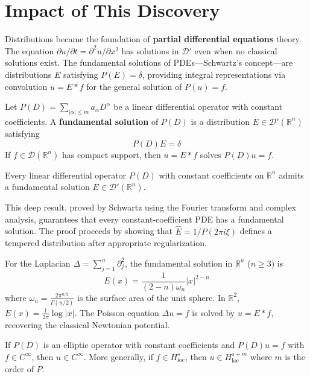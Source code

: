\section{Impact of This Discovery}

Distributions became the foundation of \textbf{partial differential equations} theory. The equation $\partial u / \partial t = \partial^2 u / \partial x^2$ has solutions in $\mathcal{D}'$ even when no classical solutions exist. The fundamental solutions of PDEs---Schwartz's concept---are distributions $E$ satisfying $P(E) = \delta$, providing integral representations via convolution $u = E * f$ for the general solution of $P(u) = f$.

\begin{definition}
Let $P(D) = \sum_{|\alpha| \leq m} a_\alpha D^\alpha$ be a linear differential operator with constant coefficients. A \textbf{fundamental solution} of $P(D)$ is a distribution $E \in \mathcal{D}'(\mathbb{R}^n)$ satisfying
\[P(D)E = \delta\]
If $f \in \mathcal{D}(\mathbb{R}^n)$ has compact support, then $u = E * f$ solves $P(D)u = f$.
\end{definition}

\begin{theorem}
Every linear differential operator $P(D)$ with constant coefficients on $\mathbb{R}^n$ admits a fundamental solution $E \in \mathcal{D}'(\mathbb{R}^n)$.
\end{theorem}

This deep result, proved by Schwartz using the Fourier transform and complex analysis, guarantees that every constant-coefficient PDE has a fundamental solution. The proof proceeds by showing that $\hat{E} = 1/P(2\pi i \xi)$ defines a tempered distribution after appropriate regularization.

For the Laplacian $\Delta = \sum_{j=1}^n \partial_j^2$, the fundamental solution in $\mathbb{R}^n$ ($n \geq 3$) is
\[E(x) = \frac{1}{(2-n)\omega_n} |x|^{2-n}\]
where $\omega_n = \frac{2\pi^{n/2}}{\Gamma(n/2)}$ is the surface area of the unit sphere. In $\mathbb{R}^2$, $E(x) = \frac{1}{2\pi} \log|x|$. The Poisson equation $\Delta u = f$ is solved by $u = E * f$, recovering the classical Newtonian potential.

\begin{theorem}
If $P(D)$ is an elliptic operator with constant coefficients and $P(D)u = f$ with $f \in C^\infty$, then $u \in C^\infty$. More generally, if $f \in H^s_{\text{loc}}$, then $u \in H^{s+m}_{\text{loc}}$ where $m$ is the order of $P$.
\end{theorem}

